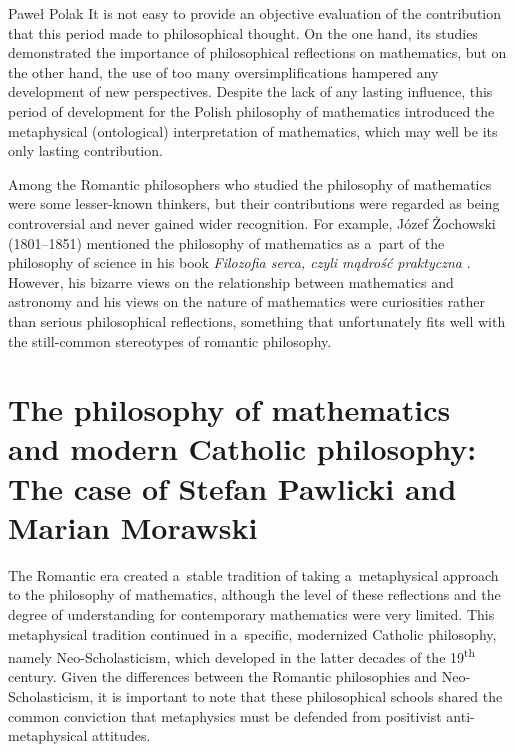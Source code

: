 \begin{artengenv}{Paweł Polak}
It is not easy to provide an objective evaluation of the contribution that this period made to philosophical thought. On the one hand, its studies demonstrated the importance of philosophical reflections on mathematics, but on the other hand, the use of too many oversimplifications hampered any development of new perspectives. Despite the lack of any lasting influence, this period of development for the Polish philosophy of mathematics introduced the metaphysical (ontological) interpretation of mathematics, which may well be its only lasting contribution.

Among the Romantic philosophers who studied the philosophy of mathematics were some lesser-known thinkers, but their contributions were regarded as being controversial and never gained wider recognition. For example, Józef Żochowski (1801–1851) mentioned the philosophy of mathematics as a~part of the philosophy of science in his book \textit{Filozofia serca, czyli mądrość praktyczna}
\parencite[][pp.1, 202–203]{zochowski_filozofia_1845}. %
 However, his bizarre views on the relationship between mathematics and astronomy and his views on the nature of mathematics were curiosities rather than serious philosophical reflections, something that unfortunately fits well with the still-common stereotypes of romantic philosophy.

\section*{The philosophy of mathematics and modern Catholic philosophy: The case of Stefan Pawlicki and Marian Morawski }

The Romantic era created a~stable tradition of taking a~metaphysical approach to the philosophy of mathematics, although the level of these reflections and the degree of understanding for contemporary mathematics were very limited. This metaphysical tradition continued in a~specific, modernized Catholic philosophy, namely Neo-Scholasticism, which developed in the latter decades of the 19\textsuperscript{th} century. Given the differences between the Romantic philosophies and Neo-Scholasticism, it is important to note that these philosophical schools shared the common conviction that metaphysics must be defended from positivist anti-metaphysical attitudes.


\end{artengenv}
